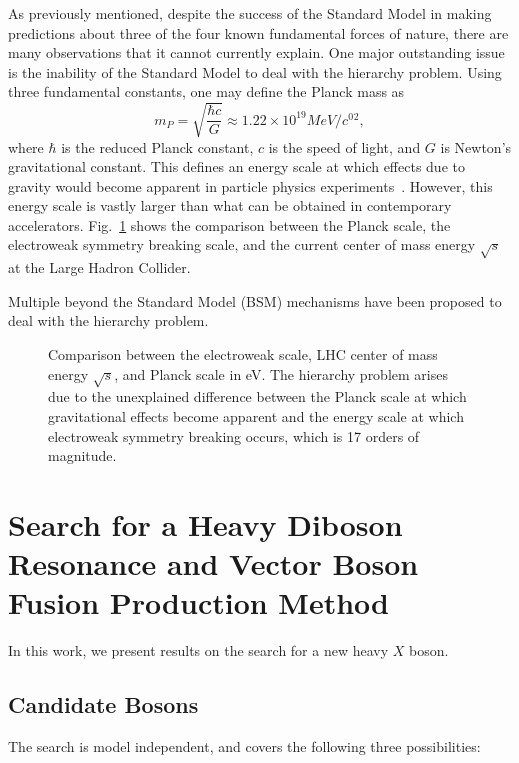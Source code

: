 As previously mentioned, despite the success of the Standard Model in making predictions about three of the four known fundamental forces of nature, there are many observations that it cannot currently explain.
One major outstanding issue is the inability of the Standard Model to deal with the hierarchy problem.
Using three fundamental constants, one may define the Planck mass as
\begin{equation}
  m_P=\sqrt{\frac{\hbar c}{G}}\approx1.22\times10^{19}\unit{MeV/\clight^2},
\end{equation}
where $\hbar$ is the reduced Planck constant, $c$ is the speed of light, and $G$ is Newton's gravitational constant.
This defines an energy scale at which effects due to gravity would become apparent in particle physics experiments~\cite{QFTNutshell}.
However, this energy scale is vastly larger than what can be obtained in contemporary accelerators.
Fig.~\ref{fig:hierarchy} shows the comparison between the Planck scale, the electroweak symmetry breaking scale, and the current center of mass energy $\sqrt{s}$ at the Large Hadron Collider.

Multiple beyond the Standard Model (BSM) mechanisms have been proposed to deal with the hierarchy problem.


\begin{figure}[htbp]
  \centering
  
  \caption{Comparison between the electroweak scale, LHC center of mass energy $\sqrt{s}$, and Planck scale in eV. The hierarchy problem arises due to the unexplained difference between the Planck scale at which gravitational effects become apparent and the energy scale at which electroweak symmetry breaking occurs, which is 17 orders of magnitude.}
  \label{fig:hierarchy}
\end{figure}

\section{Search for a Heavy Diboson Resonance and Vector Boson Fusion Production Method}
\label{sec:VBF}

In this work, we present results on the search for a new heavy $X$ boson.

\subsection{Candidate Bosons}

The search is model independent, and covers the following three possibilities:

